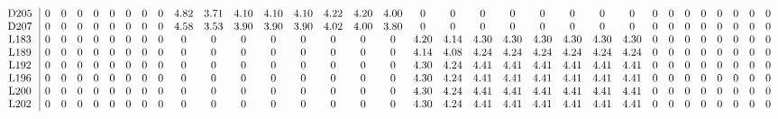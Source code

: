 \begin{table}[H]
\begin{center}
\begin{math}
\begin{array}{c|cccccccccccccccccccccccccccccccc}
\mathrm{D205} \hspace*{2pt} &  0 &  0 &  0 &  0 &  0 &  0 &  0 &  0 &       4.82 &       3.71 &       4.10 &       4.10 &       4.10 &       4.22 &       4.20 &       4.00 &  0 &  0 &  0 &  0 &  0 &  0 &  0 &  0 &  0 &  0 &  0 &  0 &  0 &  0 &  0 &  0 \\
\mathrm{D207} \hspace*{2pt} &  0 &  0 &  0 &  0 &  0 &  0 &  0 &  0 &       4.58 &       3.53 &       3.90 &       3.90 &       3.90 &       4.02 &       4.00 &       3.80 &  0 &  0 &  0 &  0 &  0 &  0 &  0 &  0 &  0 &  0 &  0 &  0 &  0 &  0 &  0 &  0 \\
\mathrm{L183} \hspace*{2pt} &  0 &  0 &  0 &  0 &  0 &  0 &  0 &  0 &  0 &  0 &  0 &  0 &  0 &  0 &  0 &  0 &       4.20 &       4.14 &       4.30 &       4.30 &       4.30 &       4.30 &       4.30 &       4.30 &  0 &  0 &  0 &  0 &  0 &  0 &  0 &  0 \\
\mathrm{L189} \hspace*{2pt} &  0 &  0 &  0 &  0 &  0 &  0 &  0 &  0 &  0 &  0 &  0 &  0 &  0 &  0 &  0 &  0 &       4.14 &       4.08 &       4.24 &       4.24 &       4.24 &       4.24 &       4.24 &       4.24 &  0 &  0 &  0 &  0 &  0 &  0 &  0 &  0 \\
\mathrm{L192} \hspace*{2pt} &  0 &  0 &  0 &  0 &  0 &  0 &  0 &  0 &  0 &  0 &  0 &  0 &  0 &  0 &  0 &  0 &       4.30 &       4.24 &       4.41 &       4.41 &       4.41 &       4.41 &       4.41 &       4.41 &  0 &  0 &  0 &  0 &  0 &  0 &  0 &  0 \\
\mathrm{L196} \hspace*{2pt} &  0 &  0 &  0 &  0 &  0 &  0 &  0 &  0 &  0 &  0 &  0 &  0 &  0 &  0 &  0 &  0 &       4.30 &       4.24 &       4.41 &       4.41 &       4.41 &       4.41 &       4.41 &       4.41 &  0 &  0 &  0 &  0 &  0 &  0 &  0 &  0 \\
\mathrm{L200} \hspace*{2pt} &  0 &  0 &  0 &  0 &  0 &  0 &  0 &  0 &  0 &  0 &  0 &  0 &  0 &  0 &  0 &  0 &       4.30 &       4.24 &       4.41 &       4.41 &       4.41 &       4.41 &       4.41 &       4.41 &  0 &  0 &  0 &  0 &  0 &  0 &  0 &  0 \\
\mathrm{L202} \hspace*{2pt} &  0 &  0 &  0 &  0 &  0 &  0 &  0 &  0 &  0 &  0 &  0 &  0 &  0 &  0 &  0 &  0 &       4.30 &       4.24 &       4.41 &       4.41 &       4.41 &       4.41 &       4.41 &       4.41 &  0 &  0 &  0 &  0 &  0 &  0 &  0 &  0 \\

\end{array}
\end{math}
\end{center}
\end{table}

